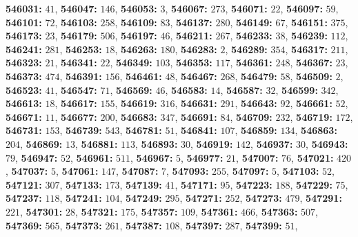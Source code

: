 \textsf{\bfseries 546031:} $41$, \textsf{\bfseries 546047:} $146$, \textsf{\bfseries 546053:} $3$, \textsf{\bfseries 546067:} $273$, \textsf{\bfseries 546071:} $22$, \textsf{\bfseries 546097:} $59$, \textsf{\bfseries 546101:} $72$, \textsf{\bfseries 546103:} $258$, \textsf{\bfseries 546109:} $83$, \textsf{\bfseries 546137:} $280$, \textsf{\bfseries 546149:} $67$, \textsf{\bfseries 546151:} $375$, \textsf{\bfseries 546173:} $23$, \textsf{\bfseries 546179:} $506$, \textsf{\bfseries 546197:} $46$, \textsf{\bfseries 546211:} $267$, \textsf{\bfseries 546233:} $38$, \textsf{\bfseries 546239:} $112$, \textsf{\bfseries 546241:} $281$, \textsf{\bfseries 546253:} $18$, \textsf{\bfseries 546263:} $180$, \textsf{\bfseries 546283:} $2$, \textsf{\bfseries 546289:} $354$, \textsf{\bfseries 546317:} $211$, \textsf{\bfseries 546323:} $21$, \textsf{\bfseries 546341:} $22$, \textsf{\bfseries 546349:} $103$, \textsf{\bfseries 546353:} $117$, \textsf{\bfseries 546361:} $248$, \textsf{\bfseries 546367:} $23$, \textsf{\bfseries 546373:} $474$, \textsf{\bfseries 546391:} $156$, \textsf{\bfseries 546461:} $48$, \textsf{\bfseries 546467:} $268$, \textsf{\bfseries 546479:} $58$, \textsf{\bfseries 546509:} $2$, \textsf{\bfseries 546523:} $41$, \textsf{\bfseries 546547:} $71$, \textsf{\bfseries 546569:} $46$, \textsf{\bfseries 546583:} $14$, \textsf{\bfseries 546587:} $32$, \textsf{\bfseries 546599:} $342$, \textsf{\bfseries 546613:} $18$, \textsf{\bfseries 546617:} $155$, \textsf{\bfseries 546619:} $316$, \textsf{\bfseries 546631:} $291$, \textsf{\bfseries 546643:} $92$, \textsf{\bfseries 546661:} $52$, \textsf{\bfseries 546671:} $11$, \textsf{\bfseries 546677:} $200$, \textsf{\bfseries 546683:} $347$, \textsf{\bfseries 546691:} $84$, \textsf{\bfseries 546709:} $232$, \textsf{\bfseries 546719:} $172$, \textsf{\bfseries 546731:} $153$, \textsf{\bfseries 546739:} $543$, \textsf{\bfseries 546781:} $51$, \textsf{\bfseries 546841:} $107$, \textsf{\bfseries 546859:} $134$, \textsf{\bfseries 546863:} $204$, \textsf{\bfseries 546869:} $13$, \textsf{\bfseries 546881:} $113$, \textsf{\bfseries 546893:} $30$, \textsf{\bfseries 546919:} $142$, \textsf{\bfseries 546937:} $30$, \textsf{\bfseries 546943:} $79$, \textsf{\bfseries 546947:} $52$, \textsf{\bfseries 546961:} $511$, \textsf{\bfseries 546967:} $5$, \textsf{\bfseries 546977:} $21$, \textsf{\bfseries 547007:} $76$, \textsf{\bfseries 547021:} $420$, \textsf{\bfseries 547037:} $5$, \textsf{\bfseries 547061:} $147$, \textsf{\bfseries 547087:} $7$, \textsf{\bfseries 547093:} $255$, \textsf{\bfseries 547097:} $5$, \textsf{\bfseries 547103:} $52$, \textsf{\bfseries 547121:} $307$, \textsf{\bfseries 547133:} $173$, \textsf{\bfseries 547139:} $41$, \textsf{\bfseries 547171:} $95$, \textsf{\bfseries 547223:} $188$, \textsf{\bfseries 547229:} $75$, \textsf{\bfseries 547237:} $118$, \textsf{\bfseries 547241:} $104$, \textsf{\bfseries 547249:} $295$, \textsf{\bfseries 547271:} $252$, \textsf{\bfseries 547273:} $479$, \textsf{\bfseries 547291:} $221$, \textsf{\bfseries 547301:} $28$, \textsf{\bfseries 547321:} $175$, \textsf{\bfseries 547357:} $109$, \textsf{\bfseries 547361:} $466$, \textsf{\bfseries 547363:} $507$, \textsf{\bfseries 547369:} $565$, \textsf{\bfseries 547373:} $261$, \textsf{\bfseries 547387:} $108$, \textsf{\bfseries 547397:} $287$, \textsf{\bfseries 547399:} $51$, 
